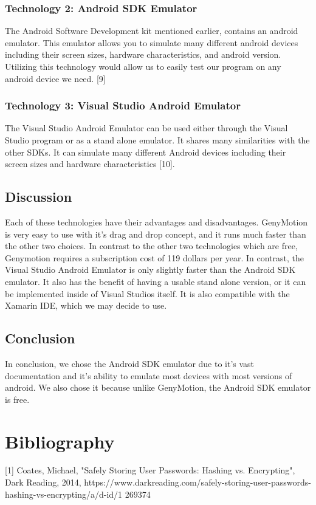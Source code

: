 \documentclass{scrreprt}
\begin{document}
\subsection{Technology 2: Android SDK Emulator}
The Android Software Development kit mentioned earlier, contains an android emulator. This
emulator allows you to simulate many different android devices including their screen sizes,
hardware characteristics, and android version. Utilizing this technology would allow us to
easily test our program on any android device we need. [9]

\subsection{Technology 3: Visual Studio Android Emulator}
The Visual Studio Android Emulator can be used either through the Visual Studio program or as a
stand alone emulator. It shares many similarities with the other SDKs. It can simulate many
different Android devices including their screen sizes and hardware characteristics [10].

\section{Discussion}
Each of these technologies have their advantages and disadvantages. GenyMotion is very easy to
use with it’s drag and drop concept, and it runs much faster than the other two choices. In
contrast to the other two technologies which are free, Genymotion requires a subscription cost
of 119 dollars per year. In contrast, the Visual Studio Android Emulator is only slightly
faster than the Android SDK emulator. It also has the benefit of having a usable stand alone
version, or it can be implemented inside of Visual Studios itself. It is also compatible with the Xamarin IDE, which we may decide to use.

\section{Conclusion}
In conclusion, we chose the Android SDK emulator due to it’s vast documentation and it’s
ability to emulate most devices with most versions of android. We also chose it because unlike
GenyMotion, the Android SDK emulator is free.

\chapter{Bibliography} %
[1] Coates, Michael, "Safely Storing User Passwords: Hashing vs. Encrypting", Dark Reading,
2014, https://www.darkreading.com/safely-storing-user-passwords-hashing-vs-encrypting/a/d-id/1
269374 \\ \relax
\end{document}
